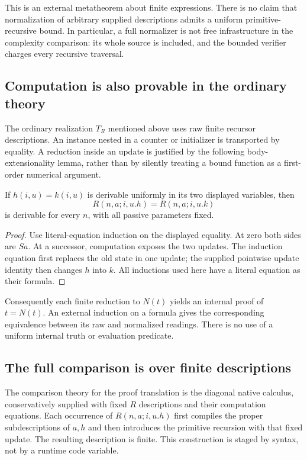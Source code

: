 This is an external metatheorem about finite expressions. There is no
claim that normalization of arbitrary supplied descriptions admits a
uniform primitive-recursive bound. In particular, a full normalizer is
not free infrastructure in the complexity comparison: its whole source
is included, and the bounded verifier charges every recursive traversal.

\subsection{Computation is also provable in the ordinary theory}

The ordinary realization $T_R$ mentioned above uses raw finite recursor
descriptions. An instance nested in a counter or initializer is transported
by equality. A reduction inside an update is justified by the following
body-extensionality lemma, rather than by silently treating a bound
function as a first-order numerical argument.

\begin{lemma}
If $h(i,u)=k(i,u)$ is derivable uniformly in its two displayed variables,
then
\[
 R(n,a;i,u.h)=R(n,a;i,u.k)
\]
is derivable for every $n$, with all passive parameters fixed.
\end{lemma}
\begin{proof}
Use literal-equation induction on the displayed equality. At zero both
sides are $Sa$. At a successor, computation exposes the two updates.
The induction equation first replaces the old state in one update;
the supplied pointwise update identity then changes $h$ into $k$.
All inductions used here have a literal equation as their formula.
\end{proof}

Consequently each finite reduction to $N(t)$ yields an internal proof
of $t=N(t)$. An external induction on a formula gives the corresponding
equivalence between its raw and normalized readings. There is no use
of a uniform internal truth or evaluation predicate.

\subsection{The full comparison is over finite descriptions}

The comparison theory for the proof translation is the diagonal native
calculus, conservatively supplied with fixed $R$ descriptions and their
computation equations. Each occurrence of $R(n,a;i,u.h)$ first compiles
the proper subdescriptions of $a,h$ and then introduces the primitive
recursion with that fixed update. The resulting description is finite.
This construction is staged by syntax, not by a runtime code variable.

